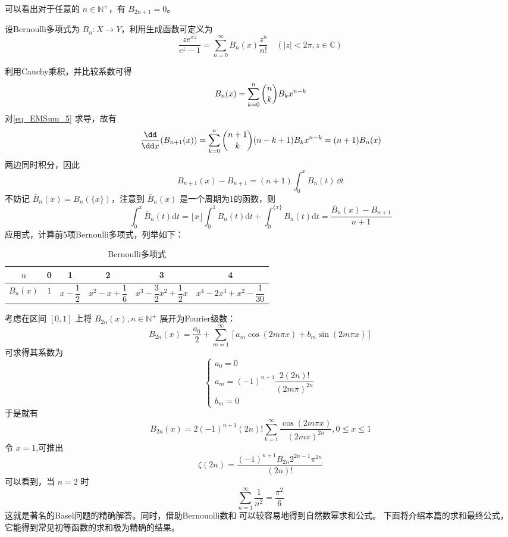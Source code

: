 可以看出对于任意的 $n\in\mathbb N^+$，有 $B_{2n+1}=0$。
\begin{definition}{}
设Bernoulli多项式为 $B_{n}:X\to Y$，利用生成函数可定义为
\begin{equation}{}
    \frac{ze^{xz}}{e^{z}-1}=\sum_{n=0}^{\infty}B_{n}(x)\frac{z^{n}}{n!}
    \quad(|z|<2\pi,z\in{\mathbb C})
\end{equation}	
\end{definition}
利用Cauchy乘积，并比较系数可得
\begin{equation}\label{eq_EMSum_5}
    B_{n}(x)=\sum_{k=0}^{n}\dbinom{n}{k}B_{k}x^{n-k}
\end{equation}
对\autoref{eq_EMSum_5} 求导，故有
\begin{equation}
    \frac{\dd}{\dd x}(B_{n+1}(x))=\sum_{k=0}^{n}\dbinom{n+1}{k}(n-k+1)B_{k}x^{n-k}=(n+1)B_{n}(x)
\end{equation}
两边同时积分，因此
\begin{equation}
    B_{n+1}(x)-B_{n+1}=(n+1)\int_{0}^{x}B_{n}(t)\,\dd t
\end{equation}
不妨记 $\bar{B}_{n}(x)=B_{n}(\{x\})$，注意到 $\bar{B}_{n}(x)$ 是一个周期为1的函数，则
\begin{equation}\label{eq_EMSum_6}
    \int_{0}^{x}\bar{B}_{n}(t)\mathrm{d}t
    =\lfloor x\rfloor\int_{0}^{1}B_{n}(t)\mathrm{d}t+\int_{0}^{\{x\}}B_{n}(t)\mathrm{d}t
    =\frac{\bar{B}_{n}(x)-B_{n+1}}{n+1}
\end{equation}
应用式，计算前5项Bernoulli多项式，列举如下：
\begin{table}[ht]
\centering
\caption{Bernoulli多项式}
\begin{tabular}{|c|c|c|c|c|c|}
\hline
$n$ & 0 & 1 & 2 & 3 & 4\\
\hline
$B_{n}(x)$ & $1$ & $x-\dfrac{1}{2}$ & $x^{2}-x+\dfrac{1}{6}$ & $x^{3}-\dfrac{3}{2}x^{2}+\dfrac{1}{2}x$ & $x^{4}-2x^{3}+x^{2}-\dfrac{1}{30}$\\
\hline
\end{tabular}
\end{table}
考虑在区间 $[0,1]$ 上将 $B_{2n}(x),n\in{\mathbb N^{+}}$ 展开为Fourier级数：
\[
    B_{2n}(x)=\frac{a_{0}}{2}+\sum_{m=1}^{\infty}[a_{m}\cos(2m\pi x)+b_{m}\sin(2m\pi x)]
\]
可求得其系数为
\begin{equation}
\begin{cases}
    a_{0}=0\\
    a_{m}=(-1)^{n+1}\dfrac{2(2n)!}{(2m\pi)^{2n}}\\
    b_{m}=0
\end{cases}
\end{equation}
于是就有
\begin{equation}
    B_{2n}(x)=2(-1)^{n+1}(2n)!\sum_{k=1}^{\infty}\frac{\cos(2m\pi x)}{(2m\pi)^{2n}},0\leqslant x\leqslant1
\end{equation}
令 $x=1$,可推出
\begin{equation}
    \zeta(2n)=\frac{(-1)^{n+1}B_{2n}2^{2n-1}\pi^{2n}}{(2n)!}
\end{equation}
可以看到，当 $n=2$ 时
\[
    \sum_{n=1}^{\infty}\frac{1}{n^2}=\frac{\pi^2}{6}
\]
这就是著名的Basel问题的精确解答。同时，借助Bernouolli数和 可以较容易地得到自然数幂求和公式。
下面将介绍本篇的求和最终公式，它能得到常见初等函数的求和极为精确的结果。

